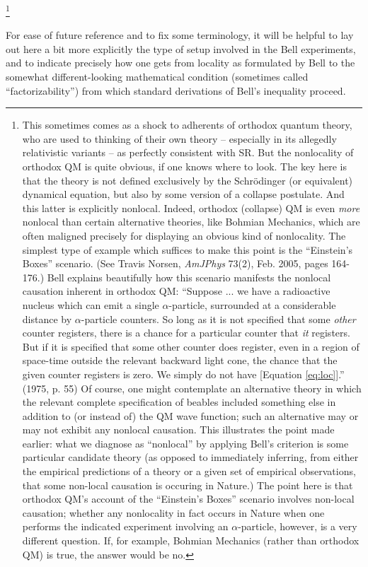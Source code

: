 \documentclass[12pt]{article}
\begin{document}
\footnote{This sometimes comes as a shock to adherents of orthodox
quantum theory, who are used to thinking of their own theory --
especially in its allegedly relativistic variants -- as perfectly
consistent with SR.  But the nonlocality of orthodox QM is quite
obvious, if one knows where to look.  The key here is that the
theory is not defined exclusively by the Schr\"odinger (or
equivalent) dynamical equation, but also by some version of a
collapse postulate.  And this latter is explicitly nonlocal.
Indeed, orthodox (collapse) QM is even \emph{more} nonlocal than
certain alternative theories, like Bohmian Mechanics, which are 
often maligned precisely for displaying an obvious kind of nonlocality.
The simplest type
of example which suffices to make this point is the ``Einstein's
Boxes'' scenario.  (See Travis Norsen, \emph{AmJPhys} 73(2), Feb. 2005,
pages 164-176.)  Bell explains beautifully how
this scenario manifests the nonlocal causation inherent in orthodox
QM:  ``Suppose ... we have a radioactive nucleus which can emit a
single $\alpha$-particle, surrounded at a considerable distance by
$\alpha$-particle counters.  So long as it is not specified that
some \emph{other} counter registers, there is a chance for a
particular counter that \emph{it} registers.  But if it is specified
that some other counter does register, even in a region of
space-time outside the relevant backward light cone, the chance that
the given counter registers is zero.  We simply do not have
[Equation \ref{eq:loc}].''  (1975, p. 55)  Of course, one might
contemplate an alternative theory in which the relevant complete
specification of beables included something else in addition to (or
instead of) the QM wave function; such an alternative may or may not
exhibit any nonlocal causation.  This illustrates the point made
earlier:  what we diagnose as ``nonlocal'' by applying Bell's
criterion is some particular candidate theory (as opposed to
immediately inferring, from either the empirical predictions of a
theory or a given set of empirical observations, that some non-local
causation is occuring in Nature.)  The point here is that
orthodox QM's account of the ``Einstein's Boxes'' scenario involves
non-local causation; whether any nonlocality in fact occurs in Nature
when one performs the indicated experiment involving an
$\alpha$-particle, however, is a very different question.  If, for
example, Bohmian Mechanics (rather than orthodox QM) is true, the
answer would be no.}

For ease of future reference and to fix some terminology, it will be 
helpful to lay out here a bit more explicitly the type of setup
involved in the Bell experiments, and to indicate precisely how one
gets from locality as formulated by Bell to the somewhat
different-looking mathematical condition (sometimes called
``factorizability'') from which standard derivations of Bell's
inequality proceed.  
\end{document}
